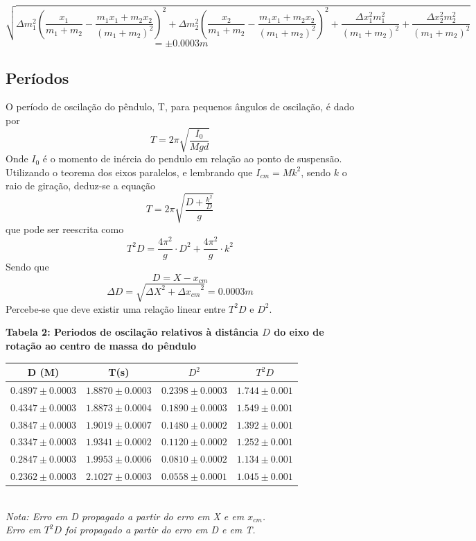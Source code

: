 \documentclass[12pt,a4paper]{article}
\begin{document}

$$\sqrt{\Delta m_{1}^{2} \left(\frac{x_{1}}{m_{1} + m_{2}} - \frac{m_{1} x_{1} + m_{2} x_{2}}{\left(m_{1} +  m_{2}\right)^{2}}\right)^{2} + \Delta m_{2}^{2} \left(\frac{x_{2}}{m_{1} + m_{2}} - \frac{m_{1} x_{1} + m_{2} x_{2}}{\left(m_{1} + m_{2}\right)^{2}}\right)^{2} + \frac{\Delta x_{1}^{2} m_{1}^{2}}{\left(m_{1} + m_{2}\right)^{2}} + \frac{\Delta x_{2}^{2} m_{2}^{2}}{\left(m_{1} + m_{2}\right)^{2}}} $$
$$ = \pm 0.0003m $$


\subsection{Períodos}
O período de oscilação do pêndulo, T, para pequenos ângulos de oscilação, é dado por
$$ T = 2 \pi \sqrt{\frac{I_0}{Mgd}} $$
Onde $I_0$ é o momento de inércia do pendulo em relação ao ponto de suspensão.
Utilizando o teorema dos eixos paralelos, e lembrando que $I_{cm} = Mk^2$, sendo 
$k$ o raio de giração, deduz-se a equação
$$ T = 2\pi\sqrt{\frac{D + \frac{k^2}{D}}{g}} $$ 
que pode ser reescrita como 
\begin{equation} \label{eq:funcao}
 T^2D = \frac{4\pi^2}{g} \cdot D^2 + \frac{4\pi^2}{g} \cdot k^2 
\end{equation}
Sendo que $$D = X - x_{cm} $$ 
$$ \Delta D = \sqrt{{\Delta X}^2 + {\Delta x_{cm}}^2}  = 0.0003 m$$
Percebe-se que deve existir uma relação linear entre $T^2D$ e $D^2$.






\begin{table}[!htbp]
\centering
\def\arraystretch{1.5}

\textbf {Tabela 2: Periodos de oscilação relativos à distância $D$ do eixo de rotação ao centro de massa do pêndulo}\\
\begin{tabular}{|c|c|c|c|}
\hline
D (M)& T(s) & $D^2$ & $T^2D$ \\
\hline
$0.4897\pm0.0003$ & $1.8870 \pm 0.0003$ & $0.2398\pm0.0003$ & $1.744 \pm 0.001$\\
\hline
$0.4347\pm0.0003$ & $1.8873 \pm 0.0004$ & $0.1890\pm0.0003$ & $1.549 \pm 0.001$\\
\hline
$0.3847\pm0.0003$ & $1.9019 \pm 0.0007$ & $0.1480\pm0.0002$ & $1.392 \pm 0.001$\\
\hline
$0.3347\pm0.0003$ & $1.9341 \pm 0.0002$ & $0.1120\pm0.0002$ & $1.252 \pm 0.001$\\
\hline
$0.2847\pm0.0003$ & $1.9953 \pm 0.0006$ & $0.0810\pm0.0002$ & $1.134 \pm 0.001$\\
\hline
$0.2362\pm0.0003$ & $2.1027 \pm 0.0003$ & $0.0558\pm0.0001$ & $1.045 \pm 0.001$\\
\hline
\end{tabular}
\\
\emph {Nota: Erro em D propagado a partir do erro em X e em $x_{cm}$.\\
			Erro em $T^2D$ foi propagado a partir do erro em D e em T.\\}
\end{table}
\end{document}
